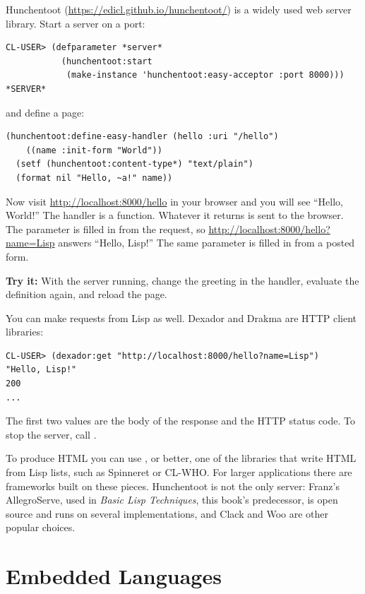 Hunchentoot (\url{https://edicl.github.io/hunchentoot/}) is a
widely used web server library. Start a server on a port:

\begin{verbatim}
CL-USER> (defparameter *server*
           (hunchentoot:start
            (make-instance 'hunchentoot:easy-acceptor :port 8000)))
*SERVER*
\end{verbatim}

\noindent
and define a page:

\begin{verbatim}
(hunchentoot:define-easy-handler (hello :uri "/hello")
    ((name :init-form "World"))
  (setf (hunchentoot:content-type*) "text/plain")
  (format nil "Hello, ~a!" name))
\end{verbatim}

Now visit \url{http://localhost:8000/hello} in your browser and you
will see ``Hello, World!'' The handler is a function. Whatever it
returns is sent to the browser. The parameter  is filled
in from the request, so \url{http://localhost:8000/hello?name=Lisp}
answers ``Hello, Lisp!'' The same parameter is filled in from a
posted form.

\textbf{Try it:} With the server running, change the greeting in the
handler, evaluate the definition again, and reload the page.

You can make requests from Lisp as well. Dexador and Drakma are HTTP
client libraries:

\begin{verbatim}
CL-USER> (dexador:get "http://localhost:8000/hello?name=Lisp")
"Hello, Lisp!"
200
...
\end{verbatim}

\noindent
The first two values are the body of the response and the HTTP status
code. To stop the server, call .

To produce HTML you can use , or better, one of the
libraries that write HTML from Lisp lists, such as Spinneret or
CL-WHO. For larger applications there are frameworks built on these
pieces. Hunchentoot is not the only server: Franz's AllegroServe, used
in \emph{Basic Lisp Techniques}, this book's predecessor, is open source and runs on several
implementations, and Clack and Woo are other popular choices.

\section{Embedded Languages}

